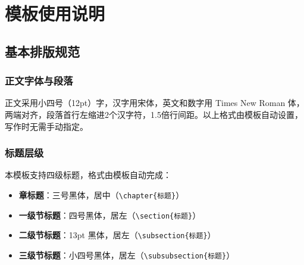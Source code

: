 \chapter{模板使用说明}


\section{基本排版规范}

\subsection{正文字体与段落}

正文采用小四号（12pt）字，汉字用宋体，英文和数字用 Times New Roman 体，两端对齐，段落首行左缩进2个汉字符，1.5倍行间距。以上格式由模板自动设置，写作时无需手动指定。

\subsection{标题层级}

本模板支持四级标题，格式由模板自动完成：

\begin{itemize}
    \item \textbf{章标题}：三号黑体，居中（\verb|\chapter{标题}|）
    \item \textbf{一级节标题}：四号黑体，居左（\verb|\section{标题}|）
    \item \textbf{二级节标题}：13pt 黑体，居左（\verb|\subsection{标题}|）
    \item \textbf{三级节标题}：小四号黑体，居左（\verb|\subsubsection{标题}|）
\end{itemize}

